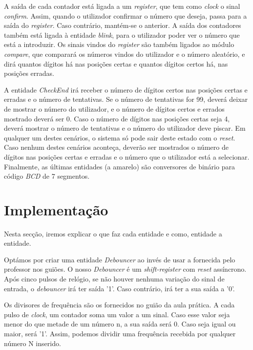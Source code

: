 \documentclass[11pt,openany,twoside]{report}
\begin{document}
A saída de cada contador está ligada a um \textit{register}, que tem como \textit{clock} o sinal \textit{confirm}. Assim, quando o utilizador confirmar o número que deseja, passa para a saída do \textit{register}. Caso contrário, mantém-se o anterior. A saída dos contadores também está ligada à entidade \textit{blink}, para o utilizador poder ver o número que está a introduzir. Os sinais vindos do \textit{register} são também ligados ao módulo \textit{compare}, que comparará os números vindos do utilizador e o número aleatório, e dirá quantos dígitos há nas posições certas e quantos dígitos certos há, nas posições erradas.

A entidade \textit{CheckEnd} irá receber o número de dígitos certos nas posições certas e erradas e o número de tentativas. Se o número de tentativas for 99, deverá deixar de mostrar o número do utilizador, e o número de dígitos certos e errados mostrado deverá ser 0. Caso o número de dígitos nas posições certas seja 4, deverá mostrar o número de tentativas e o número do utilizador deve piscar. Em qualquer um destes cenários, o sistema só pode sair deste estado com o \textit{reset}. Caso nenhum destes cenários aconteça, deverão ser mostrados o número de dígitos nas posições certas e erradas e o número que o utilizador está a selecionar. Finalmente, as últimas entidades (a amarelo) são conversores de binário para código \textit{BCD} de 7 segmentos.

\section{Implementação}

\paragraph{ } Nesta secção, iremos explicar o que faz cada entidade e como, entidade a entidade.

Optámos por criar uma entidade \textit{Debouncer} ao invés de usar a fornecida pelo professor nos guiões. O nosso \textit{Debouncer} é um \textit{shift-register} com \textit{reset} assíncrono. Após cinco pulsos de relógio, se não houver nenhuma variação do sinal de entrada, o \textit{debouncer} irá ter saída '1'. Caso contrário, irá ter a sua saída a '0'.

Os divisores de frequência são os fornecidos no guião da aula prática. A cada pulso de \textit{clock}, um contador soma um valor a um sinal. Caso esse valor seja menor do que metade de um número n, a sua saída será 0. Caso seja igual ou maior, será '1'. Assim, podemos dividir uma frequência recebida por qualquer número N inserido.
\end{document}
